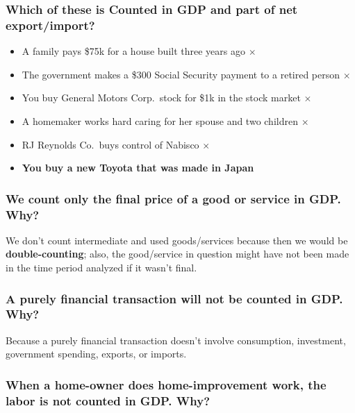 \documentclass[
  letterpaper,
  DIV=11,
  numbers=noendperiod]{scrartcl}
\providecommand{\tightlist}{%
  \setlength{\itemsep}{0pt}\setlength{\parskip}{0pt}}\usepackage{longtable,booktabs,array}
\begin{document}
\subsubsection{Which of these is Counted in GDP and part of net
export/import?}\label{which-of-these-is-counted-in-gdp-and-part-of-net-exportimport}

\begin{itemize}
\tightlist
\item
  A family pays \$75k for a house built three years ago \(\times\)
\item
  The government makes a \$300 Social Security payment to a retired
  person \(\times\)
\item
  You buy General Motors Corp.~stock for \$1k in the stock market
  \(\times\)
\item
  A homemaker works hard caring for her spouse and two children
  \(\times\)
\item
  RJ Reynolds Co.~buys control of Nabisco \(\times\)
\item
  \textbf{You buy a new Toyota that was made in Japan}
\end{itemize}

\subsubsection{We count only the final price of a good or service in
GDP.
Why?}\label{we-count-only-the-final-price-of-a-good-or-service-in-gdp.-why}

We don't count intermediate and used goods/services because then we
would be \textbf{double-counting}; also, the good/service in question
might have not been made in the time period analyzed if it wasn't final.

\subsubsection{A purely financial transaction will not be counted in
GDP.
Why?}\label{a-purely-financial-transaction-will-not-be-counted-in-gdp.-why}

Because a purely financial transaction doesn't involve consumption,
investment, government spending, exports, or imports.

\subsubsection{When a home-owner does home-improvement work, the labor
is not counted in GDP.
Why?}\label{when-a-home-owner-does-home-improvement-work-the-labor-is-not-counted-in-gdp.-why}
\end{document}
